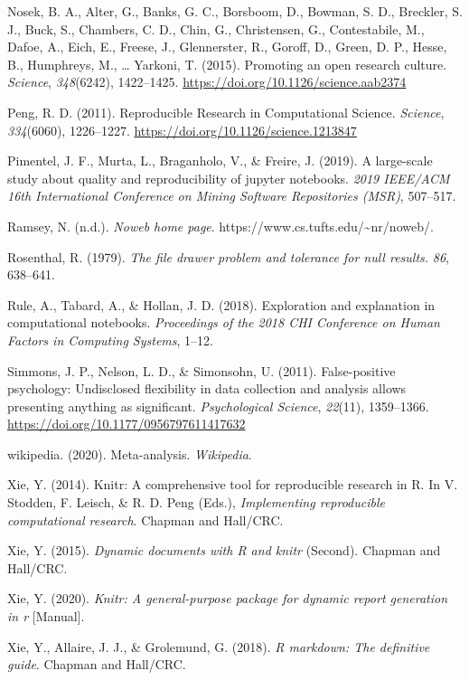 \documentclass[
  a4paper,
]{article}
\newlength{\cslhangindent}
\newenvironment{CSLReferences}[2] %
 {\begin{list}{}{%
  \setlength{\itemindent}{0pt}
  \setlength{\leftmargin}{0pt}
  \setlength{\parsep}{0pt}
  \ifodd #1
   \setlength{\leftmargin}{\cslhangindent}
   \setlength{\itemindent}{-1\cslhangindent}
  \fi
  \setlength{\itemsep}{#2\baselineskip}}}
 {\end{list}}
\begin{document}
\begin{CSLReferences}{1}{0}
Nosek, B. A., Alter, G., Banks, G. C., Borsboom, D., Bowman, S. D.,
Breckler, S. J., Buck, S., Chambers, C. D., Chin, G., Christensen, G.,
Contestabile, M., Dafoe, A., Eich, E., Freese, J., Glennerster, R.,
Goroff, D., Green, D. P., Hesse, B., Humphreys, M., \ldots{} Yarkoni, T.
(2015). Promoting an open research culture. \emph{Science},
\emph{348}(6242), 1422--1425.
\url{https://doi.org/10.1126/science.aab2374}

Peng, R. D. (2011). Reproducible {Research} in {Computational Science}.
\emph{Science}, \emph{334}(6060), 1226--1227.
\url{https://doi.org/10.1126/science.1213847}

Pimentel, J. F., Murta, L., Braganholo, V., \& Freire, J. (2019). A
large-scale study about quality and reproducibility of jupyter
notebooks. \emph{2019 IEEE/ACM 16th International Conference on Mining
Software Repositories (MSR)}, 507--517.

Ramsey, N. (n.d.). \emph{Noweb home page}.
https://www.cs.tufts.edu/\textasciitilde nr/noweb/.

Rosenthal, R. (1979). \emph{The file drawer problem and tolerance for
null results.} \emph{86}, 638--641.

Rule, A., Tabard, A., \& Hollan, J. D. (2018). Exploration and
explanation in computational notebooks. \emph{Proceedings of the 2018
CHI Conference on Human Factors in Computing Systems}, 1--12.

Simmons, J. P., Nelson, L. D., \& Simonsohn, U. (2011). False-positive
psychology: {Undisclosed} flexibility in data collection and analysis
allows presenting anything as significant. \emph{Psychological Science},
\emph{22}(11), 1359--1366.
\url{https://doi.org/10.1177/0956797611417632}

wikipedia. (2020). Meta-analysis. \emph{Wikipedia}.

Xie, Y. (2014). Knitr: {A} comprehensive tool for reproducible research
in {R}. In V. Stodden, F. Leisch, \& R. D. Peng (Eds.),
\emph{Implementing reproducible computational research}. {Chapman and
Hall/CRC}.

Xie, Y. (2015). \emph{Dynamic documents with {R} and knitr} (Second).
{Chapman and Hall/CRC}.

Xie, Y. (2020). \emph{Knitr: {A} general-purpose package for dynamic
report generation in r} {[}Manual{]}.

Xie, Y., Allaire, J. J., \& Grolemund, G. (2018). \emph{R markdown:
{The} definitive guide}. {Chapman and Hall/CRC}.

\end{CSLReferences}
\end{document}
